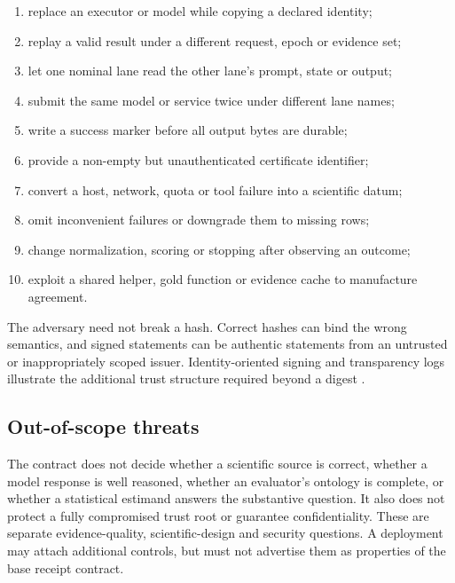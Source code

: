 \begin{enumerate}[label=\textbf{T\arabic*.}]
  \item replace an executor or model while copying a declared identity;
  \item replay a valid result under a different request, epoch or evidence set;
  \item let one nominal lane read the other lane's prompt, state or output;
  \item submit the same model or service twice under different lane names;
  \item write a success marker before all output bytes are durable;
  \item provide a non-empty but unauthenticated certificate identifier;
  \item convert a host, network, quota or tool failure into a scientific datum;
  \item omit inconvenient failures or downgrade them to missing rows;
  \item change normalization, scoring or stopping after observing an outcome;
  \item exploit a shared helper, gold function or evidence cache to manufacture agreement.
\end{enumerate}

The adversary need not break a hash. Correct hashes can bind the wrong semantics,
and signed statements can be authentic statements from an untrusted or
inappropriately scoped issuer. Identity-oriented signing and transparency logs
illustrate the additional trust structure required beyond a digest
\citep{sigstore2026signing}.

\subsection{Out-of-scope threats}

The contract does not decide whether a scientific source is correct, whether a
model response is well reasoned, whether an evaluator's ontology is complete, or
whether a statistical estimand answers the substantive question. It also does not
protect a fully compromised trust root or guarantee confidentiality. These are
separate evidence-quality, scientific-design and security questions. A deployment
may attach additional controls, but must not advertise them as properties of the
base receipt contract.

